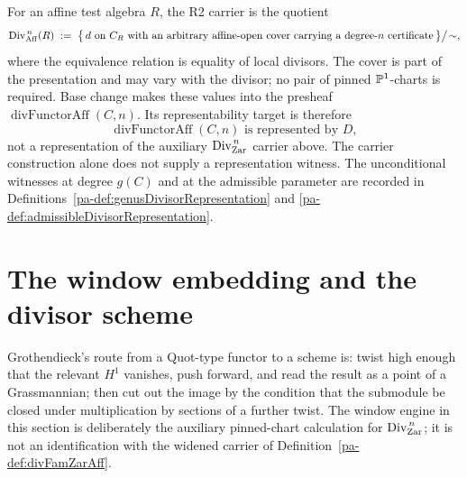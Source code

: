 \begin{definition}
  \label{pa-def:divFamZarAff}
  \leanok

  For an affine test algebra \(R\), the R2 carrier is the quotient
  \[
    \operatorname{Div}^{\,n}_{\mathrm{Aff}}(R) \;:=\;
      \bigl\{\,d\text{ on }C_R\text{ with an arbitrary affine-open cover carrying a
      degree-}n\text{ certificate}\,\bigr\}\big/\!\sim,
  \]
  where the equivalence relation is equality of local divisors. The cover is part of the
  presentation and may vary with the divisor; no pair of pinned \(\mathbb{P}^1\)-charts is required.
  Base change makes these values into the presheaf
  \(\operatorname{divFunctorAff}(C,n)\). Its representability target is therefore
  \[
    \operatorname{divFunctorAff}(C,n)\text{ is represented by }D,
  \]
  not a representation of the auxiliary \(\operatorname{Div}^{\,n}_{\mathrm{Zar}}\) carrier above.
  The carrier construction alone does not supply a representation witness.  The
  unconditional witnesses at degree \(g(C)\) and at the admissible parameter are recorded in
  Definitions~\ref{pa-def:genusDivisorRepresentation} and
  \ref{pa-def:admissibleDivisorRepresentation}.
\end{definition}

\section{The window embedding and the divisor scheme}
\label{pa-sec:divscheme}

Grothendieck's route from a Quot-type functor to a scheme is: twist high enough that the
relevant \(H^1\) vanishes, push forward, and read the result as a point of a Grassmannian;
then cut out the image by the condition that the submodule be closed under multiplication
by sections of a further twist. The window engine in this section is deliberately the
auxiliary pinned-chart calculation for \(\operatorname{Div}^{\,n}_{\mathrm{Zar}}\); it is not an identification
with the widened carrier of Definition~\ref{pa-def:divFamZarAff}.

